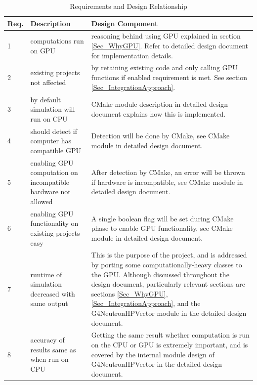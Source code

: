 \documentclass[12pt]{article}
\begin{document}
\begin{center}
\begin{longtable}{>{\raggedright\arraybackslash}p{}>{\raggedright\arraybackslash}p{}>{\raggedright\arraybackslash}p{}}

\caption{Requirements and Design Relationship}\label{Table_RequirementsAndDesign}
\\\toprule
\bf Req. & \bf Description & \bf Design Component\\\toprule
\arrayrulecolor{lightgray}

1  & computations run on GPU & reasoning behind using GPU explained in section \ref{Sec_WhyGPU}. Refer to detailed design document for implementation details.\\\hline

2  & existing projects not affected & by retaining existing code and only calling GPU functions if enabled requirement is met. See section \ref{Sec_IntegrationApproach}.\\\hline

3  & by default simulation will run on CPU & CMake module description in detailed design document explains how this is implemented.\\\hline

4  & should detect if computer has compatible GPU & Detection will be done by CMake, see CMake module in detailed design document.\\\hline

5  & enabling GPU computation on incompatible hardware not allowed & After detection by CMake, an error will be thrown if hardware is incompatible, see CMake module in detailed design document.\\\hline

6  & enabling GPU functionality on existing projects easy & A single boolean flag will be set during CMake phase to enable GPU functionality, see CMake module in detailed design document.\\\hline

7 & runtime of simulation decreased with same output & This is the purpose of the project, and is addressed by porting some computationally-heavy classes to the GPU. Although discussed throughout the design document, particularly relevant sections are sections \ref{Sec_WhyGPU}, \ref{Sec_IntegrationApproach}, and the G4NeutronHPVector module in the detailed design document.\\\hline

8 & accuracy of results same as when run on CPU & Getting the same result whether computation is run on the CPU or GPU is extremely important, and is covered by the internal module design of G4NeutronHPVector in the detailed design document.\\\hline


\end{longtable}
\end{center}
\end{document}
